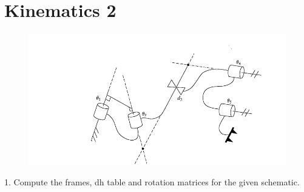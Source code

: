 \documentclass{article}
\begin{document}
\section{Kinematics 2}
\begin{figure}[htp]
    \centering
    \includegraphics[width=12cm]{arm schematic2.png}
    \caption{}
    \label{fig:Arm}
\end{figure}
1. Compute the frames, dh table and rotation matrices for the given schematic.
\end{document}
